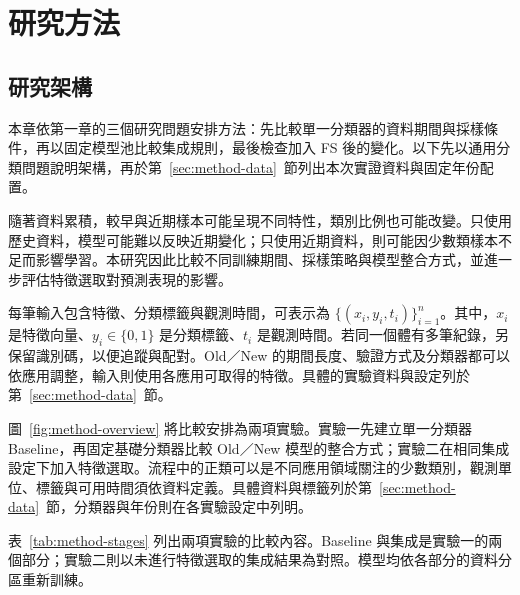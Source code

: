 \chapter{研究方法}\label{chap:method}
\begingroup
\setlength{\emergencystretch}{2em}

\section{研究架構}\label{sec:method-framework}

本章依第一章的三個研究問題安排方法：先比較單一分類器的資料期間與採樣條件，再以固定模型池比較集成規則，最後檢查加入 FS 後的變化。以下先以通用分類問題說明架構，再於第~\ref{sec:method-data}~節列出本次實證資料與固定年份配置。

隨著資料累積，較早與近期樣本可能呈現不同特性，類別比例也可能改變。只使用歷史資料，模型可能難以反映近期變化；只使用近期資料，則可能因少數類樣本不足而影響學習。本研究因此比較不同訓練期間、採樣策略與模型整合方式，並進一步評估特徵選取對預測表現的影響。

每筆輸入包含特徵、分類標籤與觀測時間，可表示為 \(\{(x_i,y_i,t_i)\}_{i=1}^{n}\)。其中，\(x_i\) 是特徵向量、\(y_i\in\{0,1\}\) 是分類標籤、\(t_i\) 是觀測時間。若同一個體有多筆紀錄，另保留識別碼，以便追蹤與配對。Old／New 的期間長度、驗證方式及分類器都可以依應用調整，輸入則使用各應用可取得的特徵。具體的實驗資料與設定列於第~\ref{sec:method-data}~節。

圖~\ref{fig:method-overview} 將比較安排為兩項實驗。實驗一先建立單一分類器 Baseline，再固定基礎分類器比較 Old／New 模型的整合方式；實驗二在相同集成設定下加入特徵選取。流程中的正類可以是不同應用領域關注的少數類別，觀測單位、標籤與可用時間須依資料定義。具體資料與標籤列於第~\ref{sec:method-data}~節，分類器與年份則在各實驗設定中列明。

表~\ref{tab:method-stages} 列出兩項實驗的比較內容。Baseline 與集成是實驗一的兩個部分；實驗二則以未進行特徵選取的集成結果為對照。模型均依各部分的資料分區重新訓練。

